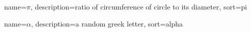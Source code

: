 {
  name={\ensuremath{\pi}},
  description={ratio of circumference of circle to its
               diameter},
  sort=pi
}

{
  name={\ensuremath{\alpha}},
  description={a random greek letter},
  sort=alpha
}